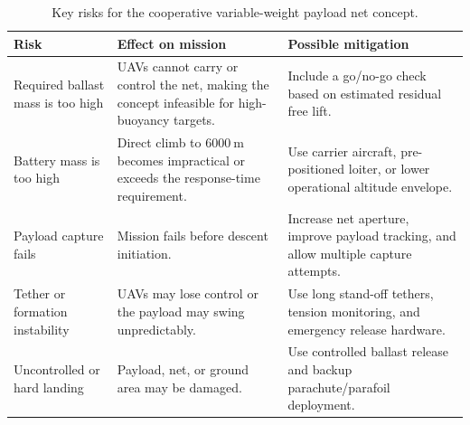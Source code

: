 \begin{table}[H]
\centering
\small
\caption{Key risks for the cooperative variable-weight payload net concept.}
\label{tab:conceptD_key_risks}
\begin{tabularx}{\textwidth}{p{} X p{}}
\toprule
\textbf{Risk} & \textbf{Effect on mission} & \textbf{Possible mitigation} \\
\midrule
Required ballast mass is too high & UAVs cannot carry or control the net, making the concept infeasible for high-buoyancy targets. & Include a go/no-go check based on estimated residual free lift. \\
Battery mass is too high & Direct climb to \(6000~\mathrm{m}\) becomes impractical or exceeds the response-time requirement. & Use carrier aircraft, pre-positioned loiter, or lower operational altitude envelope. \\
Payload capture fails & Mission fails before descent initiation. & Increase net aperture, improve payload tracking, and allow multiple capture attempts. \\
Tether or formation instability & UAVs may lose control or the payload may swing unpredictably. & Use long stand-off tethers, tension monitoring, and emergency release hardware. \\
Uncontrolled or hard landing & Payload, net, or ground area may be damaged. & Use controlled ballast release and backup parachute/parafoil deployment. \\
\bottomrule
\end{tabularx}
\end{table}




